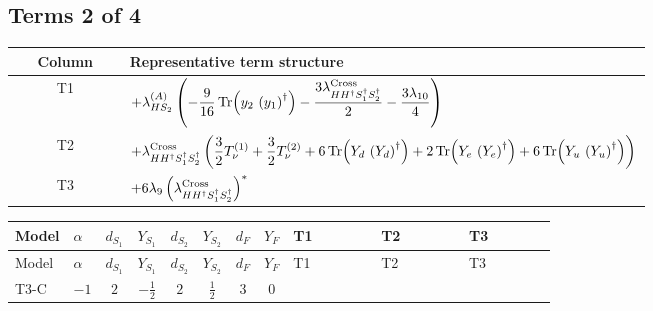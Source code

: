 \documentclass[8pt]{article}
\begin{document}
\begin{landscape}
\subsection*{Terms 2 of 4}
\begin{center}
\begin{tabular}{@{}c >{\raggedright\arraybackslash}p{0.82\linewidth}@{}}
\toprule
Column & Representative term structure \\
\midrule
T1 & \(\displaystyle +{\lambda_{HS_2}^{(A)}} \left(-\frac{9}{16} \operatorname{Tr}\!\left({y_2}\,\left({y_1}\right)^{\dagger}\right)-\frac{3 {\lambda_{H H^\dagger S_1^\dagger S_2^\dagger}^{\rm Cross}}}{2}-\frac{3 {\lambda_{10}}}{4}\right)\) \\
\midrule
T2 & \(\displaystyle +{\lambda_{H H^\dagger S_1^\dagger S_2^\dagger}^{\rm Cross}} \left(\frac{3}{2} T_{\nu}^{(1)}+\frac{3}{2} T_{\nu}^{(2)}+6 \operatorname{Tr}\!\left({Y_d}\,\left({Y_d}\right)^{\dagger}\right)+2 \operatorname{Tr}\!\left({Y_e}\,\left({Y_e}\right)^{\dagger}\right)+6 \operatorname{Tr}\!\left({Y_u}\,\left({Y_u}\right)^{\dagger}\right)\right)\) \\
\midrule
T3 & \(\displaystyle +6 {\lambda_{9}} \left({\lambda_{H H^\dagger S_1^\dagger S_2^\dagger}^{\rm Cross}}\right)^{*}\) \\
\midrule
\bottomrule
\end{tabular}
\end{center}
\smallskip
\tiny
\begin{longtable}{@{}llcccccc >{\raggedright\arraybackslash}p{0.21\linewidth} >{\raggedright\arraybackslash}p{0.21\linewidth} >{\raggedright\arraybackslash}p{0.21\linewidth}@{}}
\toprule
Model & $\alpha$ & $d_{S_1}$ & $Y_{S_1}$ & $d_{S_2}$ & $Y_{S_2}$ & $d_F$ & $Y_F$ & T1 & T2 & T3 \\
\midrule
\endfirsthead
\toprule
Model & $\alpha$ & $d_{S_1}$ & $Y_{S_1}$ & $d_{S_2}$ & $Y_{S_2}$ & $d_F$ & $Y_F$ & T1 & T2 & T3 \\
\midrule
\endhead
T3-C & $-1$ & $2$ & $-\frac{1}{2}$ & $2$ & $\frac{1}{2}$ & $3$ & $0$ & \scriptsize\adjustbox{max width=\linewidth}{$\begin{gathered} +{\lambda_{HS_2}^{(A)}} \left(-\frac{9}{16} \operatorname{Tr}\!\left({y_2}\,\left({y_1}\right)^{\dagger}\right)-\frac{3 {\lambda_{H H^\dagger S_1^\dagger S_2^\dagger}^{\rm Cross}}}{2}-\frac{3 {\lambda_{10}}}{4}\right)\end{gathered}$} & \scriptsize\adjustbox{max width=\linewidth}{$\begin{gathered} +{\lambda_{H H^\dagger S_1^\dagger S_2^\dagger}^{\rm Cross}} \left(\frac{3}{2} T_{\nu}^{(1)}+\frac{3}{2} T_{\nu}^{(2)}+6 \operatorname{Tr}\!\left({Y_d}\,\left({Y_d}\right)^{\dagger}\right)+2 \operatorname{Tr}\!\left({Y_e}\,\left({Y_e}\right)^{\dagger}\right)+6 \operatorname{Tr}\!\left({Y_u}\,\left({Y_u}\right)^{\dagger}\right)\right)\end{gathered}$} & \scriptsize\adjustbox{max width=\linewidth}{$\begin{gathered} +6 {\lambda_{9}} \left({\lambda_{H H^\dagger S_1^\dagger S_2^\dagger}^{\rm Cross}}\right)^{*}\end{gathered}$} \\

\end{longtable}
\end{landscape}
\end{document}
